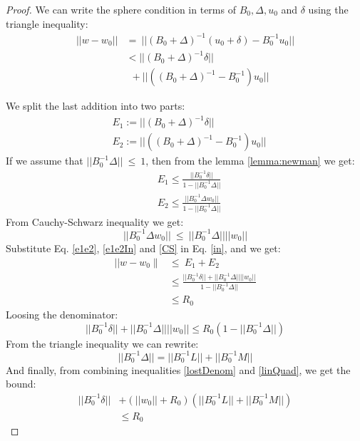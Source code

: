 \documentclass[11pt,twocolumn,varwidth=true,a4paper,fleqn]{article}
\begin{document}
\begin{proof}
We can write the sphere condition in terms of $B_0, \Delta, u_0$ and $\delta$ using the triangle
inequality:
\begin{equation} \label{in}
\begin{split}
||w-w_0|| & = \ ||(B_0+\Delta)^{-1}(u_0+\delta) - B_0^{-1}u_0|| \\
& < ||(B_0+\Delta)^{-1}\delta|| \\
& \ \ + ||((B_0+\Delta)^{-1} - B_0^{-1})u_0||
\end{split}
\end{equation}

We split the last addition into two parts:
\begin{equation}  \label{e1e2}
\begin{split}
& E_1:= ||(B_0+\Delta)^{-1}\delta|| \\
& E_2:= ||((B_0+\Delta)^{-1} - B_0^{-1})u_0||
\end{split}
\end{equation}
If we assume that $||B_0^{-1}\Delta||\ \leq \ 1$, 
then from the lemma \ref{lemma:newman} we get:
\begin{equation} \label{e1e2In}
\begin{split}
& E_1 \leq \frac{||B_0^{-1}\delta||}{1-||B_0^{-1}\Delta||} \\
& E_2 \leq  \frac{|| B_0^{-1}\Delta w_0||}{1-||B_0^{-1}\Delta||}
\end{split}
\end{equation}
From Cauchy-Schwarz inequality we get:
\begin{equation} \label{CS}
||B_0^{-1}\Delta w_0|| \ \leq \ ||B_0^{-1}\Delta||||w_0||
\end{equation}
Substitute Eq. \ref{e1e2}, \ref{e1e2In} and \ref{CS} in Eq. \ref{in}, and we
get:
\begin{equation}
\begin{split}
|| w-w_0 \parallel & \leq \ E_1+E_2 \\
& \leq \frac{||B_0^{-1}\delta|| + ||B_0^{-1}\Delta||||w_0||}{1 -||B_0^{-1}\Delta||} \\
& \leq R_0
\end{split}
\end{equation}
Loosing the denominator:
\begin{equation} \label{lostDenom}
||B_0^{-1}\delta|| + ||B_0^{-1}\Delta||||w_0||
\leq R_0(1 -||B_0^{-1}\Delta||)
\end{equation}
From the triangle inequality we can rewrite:
\begin{equation} \label{linQuad}
||B_0^{-1}\Delta|| = ||B_0^{-1}L||+||B_0^{-1}M||
\end{equation}
And finally, from combining inequalities \ref{lostDenom} and \ref{linQuad},
we get the bound:
\begin{equation} \label{convexBound}
\begin{split}
||B_0^{-1}\delta|| &+ (||w_0||+R_0)(||B_0^{-1}L||+||B_0^{-1}M||) \\ & \leq  R_0
\end{split}
\end{equation}
\end{proof}
\end{document}
